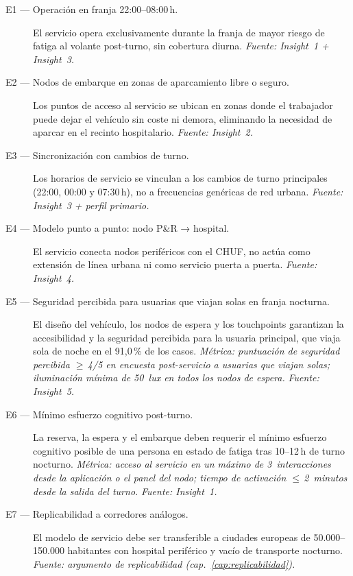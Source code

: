\begin{description}
  \item[E1 — Operación en franja 22:00--08:00\,h.]
        El servicio opera exclusivamente durante la franja de mayor
        riesgo de fatiga al volante post-turno, sin cobertura diurna.
        \emph{Fuente: Insight~1 + Insight~3.}

  \item[E2 — Nodos de embarque en zonas de aparcamiento libre o seguro.]
        Los puntos de acceso al servicio se ubican en zonas donde el
        trabajador puede dejar el vehículo sin coste ni demora,
        eliminando la necesidad de aparcar en el recinto hospitalario.
        \emph{Fuente: Insight~2.}

  \item[E3 — Sincronización con cambios de turno.]
        Los horarios de servicio se vinculan a los cambios de turno
        principales (22:00, 00:00 y 07:30\,h), no a frecuencias
        genéricas de red urbana.
        \emph{Fuente: Insight~3 + perfil primario.}

  \item[E4 — Modelo punto a punto: nodo P\&R → hospital.]
        El servicio conecta nodos periféricos con el \acs{CHUF}, no
        actúa como extensión de línea urbana ni como servicio
        puerta a puerta.
        \emph{Fuente: Insight~4.}

  \item[E5 — Seguridad percibida para usuarias que viajan solas en
        franja nocturna.]
        El diseño del vehículo, los nodos de espera y los touchpoints
        garantizan la accesibilidad y la seguridad percibida para la
        usuaria principal, que viaja sola de noche en el 91{,}0\,\%
        de los casos.
        \emph{Métrica: puntuación de seguridad percibida
        $\geq$\,4/5 en encuesta post-servicio a usuarias que viajan
        solas; iluminación mínima de 50~lux en todos los nodos
        de espera.}
        \emph{Fuente: Insight~5.}

  \item[E6 — Mínimo esfuerzo cognitivo post-turno.]
        La reserva, la espera y el embarque deben requerir el mínimo
        esfuerzo cognitivo posible de una persona en estado de fatiga
        tras 10--12\,h de turno nocturno.
        \emph{Métrica: acceso al servicio en un máximo de
        3~interacciones desde la aplicación o el panel del nodo;
        tiempo de activación $\leq$\,2~minutos desde la salida
        del turno.}
        \emph{Fuente: Insight~1.}

  \item[E7 — Replicabilidad a corredores análogos.]
        El modelo de servicio debe ser transferible a ciudades europeas
        de 50.000--150.000 habitantes con hospital periférico y vacío
        de transporte nocturno.
        \emph{Fuente: argumento de replicabilidad (cap.~\ref{cap:replicabilidad}).}
\end{description}

